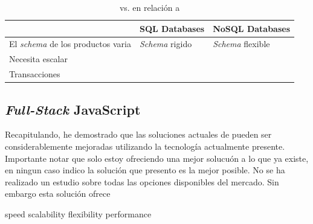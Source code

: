 \begin{table}[h!]
    \tiny
   
\begin{tabular}{ |L{0.1\paperwidth}|L{0.3\paperwidth}|L{0.3\paperwidth}|}
\hline
	\ecommerce&
	SQL Databases &
	NoSQL Databases
 
\\ \hline
	El \textit{schema} de los productos varia&
	\textit{Schema} rigido&
	\textit{Schema} flexible
\\ \hline
	Necesita escalar&
	&
	
\\ \hline
	Transacciones&
	&
	
\\ \hline
\end{tabular}
    \caption{ \nosql vs. \sql en relación a \ecommerce}
    \label{tab:SQL_vs_noSQL_summary}
\end{table}

	\subsection{ \textit{Full-Stack} JavaScript }
	



Recapitulando, he demostrado que las soluciones actuales de \ecommerce pueden ser considerablemente mejoradas utilizando la tecnología actualmente presente. 
Importante notar que solo estoy ofreciendo una mejor solucuón a lo que ya existe, en ningun caso indico la solución que presento es la mejor posible. No se ha realizado un estudio sobre todas las opciones disponibles del mercado. Sin embargo esta solución ofrece

speed
scalability
flexibility
performance
